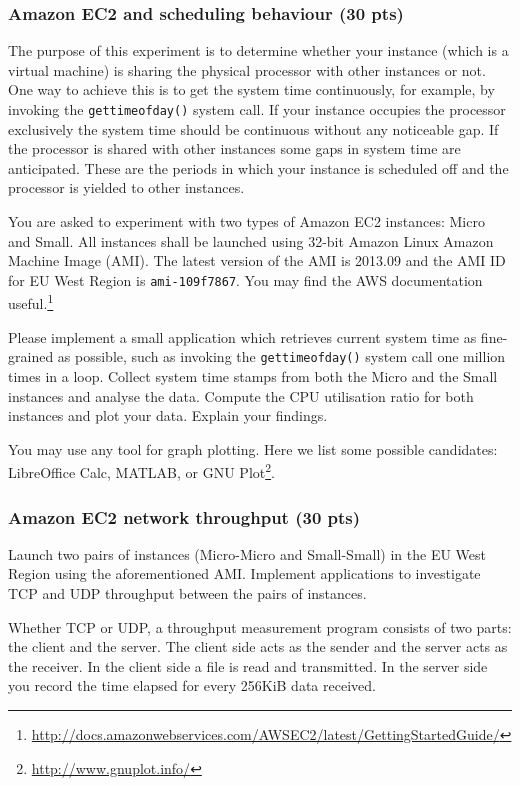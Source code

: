 \documentclass[12pt, a4paper]{article}
\begin{document}
\subsubsection{Amazon EC2 and scheduling behaviour (30 pts)}
The purpose of this experiment is to determine whether your instance (which is a virtual machine) is sharing the physical processor with other instances or not.
One way to achieve this is to get the system time continuously, for example, by invoking the \texttt{gettimeofday()} system call.
If your instance occupies the processor exclusively the system time should be continuous without any noticeable gap.
If the processor is shared with other instances some gaps in system time are anticipated.
These are the periods in which your instance is scheduled off and the processor is yielded to other instances.

You are asked to experiment with two types of Amazon EC2 instances: Micro and Small.
All instances shall be launched using 32-bit Amazon Linux Amazon Machine Image (AMI).
The latest version of the AMI is 2013.09 and the AMI ID for EU West Region is \texttt{ami-109f7867}.
You may find the AWS documentation useful.\footnote{\url{http://docs.amazonwebservices.com/AWSEC2/latest/GettingStartedGuide/}}

Please implement a small application which retrieves current system time as fine-grained as possible, such as invoking the \texttt{gettimeofday()} system call one million times in a loop.
Collect system time stamps from both the Micro and the Small instances and analyse the data.
Compute the CPU utilisation ratio for both instances and plot your data.
Explain your findings.

You may use any tool for graph plotting.
Here we list some possible candidates: LibreOffice Calc, MATLAB, or GNU Plot\footnote{\url{http://www.gnuplot.info/}}.

\subsubsection{Amazon EC2 network throughput (30 pts)}
Launch two pairs of instances (Micro-Micro and Small-Small) in the EU West Region using the aforementioned AMI.
Implement applications to investigate TCP and UDP throughput between the pairs of instances.

Whether TCP or UDP, a throughput measurement program consists of two parts: the client and the server.
The client side acts as the sender and the server acts as the receiver.
In the client side a file is read and transmitted.
In the server side you record the time elapsed for every 256KiB data received.
\end{document}
